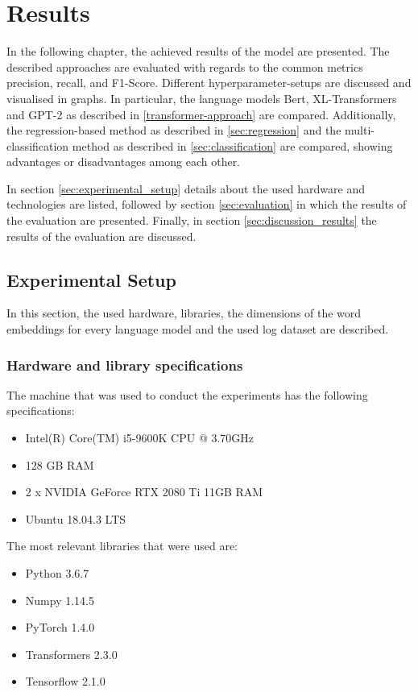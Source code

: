 \chapter{Results\label{cha:results}}

In the following chapter, the achieved results of the model are presented. The described approaches are evaluated with regards to the common metrics precision, recall, and F1-Score. Different hyperparameter-setups are discussed and visualised in graphs. In particular, the language models Bert, XL-Transformers and GPT-2 as described in \ref{transformer-approach} are compared. Additionally, the regression-based method as described in \ref{sec:regression} and the multi-classification method as described in \ref{sec:classification} are compared, showing advantages or disadvantages among each other.

In section \ref{sec:experimental_setup} details about the used hardware and technologies are listed, followed by section \ref{sec:evaluation} in which the results of the evaluation are presented. Finally, in section \ref{sec:discussion_results} the results of the evaluation are discussed.


\section{Experimental Setup\label{sec:experimental_setup}}
In this section, the used hardware, libraries, the dimensions of the word embeddings for every language model and the used log dataset are described.

\subsection{Hardware and library specifications}
The machine that was used to conduct the experiments has the following specifications:
\begin{itemize}
	\item Intel(R) Core(TM) i5-9600K CPU @ 3.70GHz
	\item 128 GB RAM
	\item 2 x NVIDIA GeForce RTX 2080 Ti 11GB RAM
	\item Ubuntu 18.04.3 LTS
\end{itemize}

\noindent The most relevant libraries that were used are:
\begin{itemize}
	\item Python 3.6.7
	\item Numpy 1.14.5
	\item PyTorch 1.4.0
	\item Transformers 2.3.0
	\item Tensorflow 2.1.0
\end{itemize}

